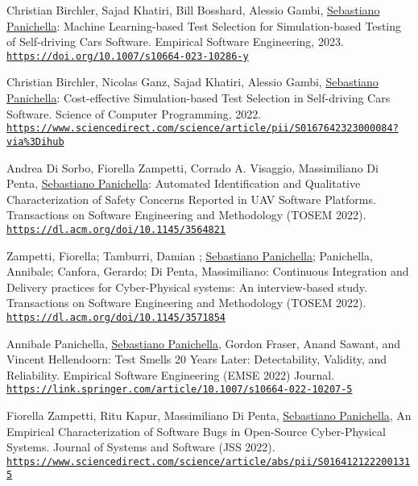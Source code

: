 \documentclass[10pt]{article}
\providecommand*\url[1]{\href{#1}{#1}}
\renewcommand*\url[1]{\href{#1}{\texttt{#1}}}
\begin{document}
\begin{bibenum}
\item \label{J23} Christian Birchler, Sajad Khatiri, Bill Bosshard, Alessio Gambi, \underline{Sebastiano Panichella}: Machine Learning-based Test Selection for Simulation-based Testing of Self-driving Cars Software. Empirical Software Engineering, 2023. \\\url{https://doi.org/10.1007/s10664-023-10286-y}
\item \label{J22} Christian Birchler, Nicolas Ganz, Sajad Khatiri, Alessio Gambi,  \underline{Sebastiano Panichella}: Cost-effective Simulation-based Test Selection in Self-driving Cars Software. Science of Computer Programming, 2022.\\\url{https://www.sciencedirect.com/science/article/pii/S0167642323000084?via\%3Dihub}

\item \label{J21} Andrea Di Sorbo, Fiorella Zampetti, Corrado A. Visaggio, Massimiliano Di Penta, \underline{Sebastiano Panichella}: Automated Identification and Qualitative Characterization of Safety Concerns Reported in UAV Software Platforms.    Transactions on Software Engineering and Methodology (TOSEM 2022).\\\url{https://dl.acm.org/doi/10.1145/3564821}

\item \label{J20} Zampetti, Fiorella; Tamburri, Damian ; \underline{Sebastiano Panichella}; Panichella, Annibale; Canfora, Gerardo; Di Penta, Massimiliano:    Continuous Integration and Delivery practices for Cyber-Physical systems: An interview-based study.  Transactions on Software Engineering and Methodology (TOSEM 2022). \\\url{https://dl.acm.org/doi/10.1145/3571854}
\item \label{J19} Annibale Panichella, \underline{Sebastiano Panichella}, Gordon Fraser, Anand Sawant, and Vincent Hellendoorn: Test Smells 20 Years Later: Detectability, Validity, and Reliability.    Empirical Software Engineering (EMSE 2022) Journal. \\\url{https://link.springer.com/article/10.1007/s10664-022-10207-5}
\item \label{J18} Fiorella Zampetti, Ritu Kapur, Massimiliano Di Penta,  \underline{Sebastiano Panichella}, An Empirical Characterization of Software Bugs in Open-Source Cyber-Physical Systems.    Journal of Systems and Software (JSS 2022).\\\url{https://www.sciencedirect.com/science/article/abs/pii/S0164121222001315} 


\end{bibenum}
\end{document}
